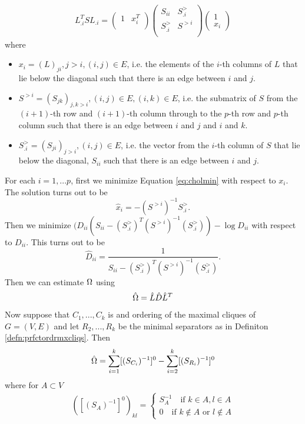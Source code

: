\documentclass[12pt, leqno]{article}
\let\oldhat\hat
\renewcommand{\hat}[1]{\oldhat{{#1}}}
\def\om{\ensuremath\Omega}
\begin{document}
\begin{align}
\label{eq:cholmin}
L_{.i}^TSL_{.i} = \begin{pmatrix} 1 & x_i^T \\
\end{pmatrix}
\begin{pmatrix} S_{ii} & S_{.i}^> \\
S_{.i}^> & S^{>i} \\
\end{pmatrix}
\begin{pmatrix} 1 \\ x_i
\end{pmatrix}
\end{align}
where
\begin{itemize}
\item $x_i = (L)_{ji}, j>i ,(i,j) \in E$, i.e. the elements of
the $i$-th columns of $L$ that lie below the diagonal such that there is an edge between $i$ and $j$.
\item $S^{>i} = (S_{jk})_{j,k>i},(i,j) \in E,(i,k) \in E$, i.e. the submatrix of $S$ from
  the $(i+1)$-th row and $(i+1)$-th column through to the $p$-th row and $p$-th column
 such that there is an edge between $i$ and $j$ and $i$ and $k$.
\item $S_{.i}^>  = (S_{ji})_{j>i},(i,j) \in E$, i.e. the vector from
  the $i$-th column of $S$ that lie below the diagonal, $S_{ii}$
 such that there is an edge between $i$ and $j$.
\end{itemize}
For each $i = 1,...p$, first we minimize Equation \ref{eq:cholmin} with respect to $x_i$. The
solution turns out to be 
\[
\hat{x}_i = -(S^{>i})^{-1} S_{.i}^>. 
\]
Then we minimize $(D_{ii}(S_{ii} -  (S_{.i}^>)^{T} (S^{>i})^{-1} (S_{.i}^>))-\log D_{ii}$ with respect
to $D_{ii}$. This turns out to be
\[
\hat{D}_{ii} = \frac{1}{S_{ii} -  (S_{.i}^>)^{T} (S^{>i})^{-1} (S_{.i}^>)}.
\]
Then we can estimate $\om$ using
\begin{align}
\label{eq:omegahatgeneral}
\hat{\om} = \hat{L} \hat{D} \hat{L}^T
\end{align}
Now suppose that $C_1,...,C_k$ is and ordering of the maximal cliques
of $G = (V,E)$ and let $R_2,...,R_k$ be the minimal separators as in Definiton
\ref{defn:prfctordrmxcliqs}. Then 
\begin{align}
\label{eq:omegahatclosed}
\hat{\om} = \sum_{i = 1}^k [(S_{C_i})^{-1}]^0 - \sum_{i = 2}^k [(S_{R_i})^{-1}]^0
\end{align}
where for $A \subset V$
\begin{align*}
 ([(S_{A})^{-1}]^0)_{kl} =  \begin{cases} S_A^{-1} \quad \text{if }
   k \in A, l \in A\\
0 \quad \text{if } k \not\in A \text{ or } l \not\in A  
\end{cases}
\end{align*}
\end{document}
